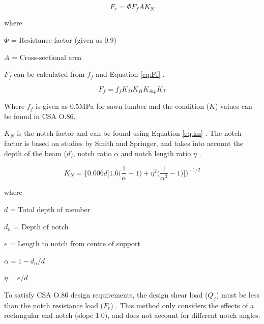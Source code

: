 \documentclass[11pt,a4paper]{article}
\numberwithin{equation}{subsection}
\begin{document}
	\begin{equation}
	F_{r} = \Phi F_{f} A K_{N} 
	\end{equation}     
     
     where\par
     $ \Phi $ = Resistance factor (given as 0.9) \par
     $ A $ = Cross-sectional area
     
     \vspace*{\baselineskip}
     
     \noindent
     $F_{f}$ can be calculated from $f_{f}$ and Equation \ref{eq:Ff} \cite{_csa_2014,_errata:_2013}.
     
   	\begin{equation}
   	F_{f} = f_{f} K_{D} K_{H} K_{Stp} K_{T}
   	\label{eq:Ff} 
   	\end{equation}  
     
     \noindent
     Where $f_{f}$ is given as 0.5MPa for sawn lumber and the condition ($K$) values can be found in CSA O.86.
 
     \vspace*{\baselineskip}
    
     \noindent    
     $K_{N}$ is the notch factor and can be found using Equation \ref{eq:kn} \cite{jockwer_structural_2014,_csa_2014}. The notch factor is based on studies by Smith and Springer, and takes into account the depth of the beam ($d$), notch ratio $\alpha$ and notch length ratio $\eta$ \cite{smith_consideration_1993}.
     
	\begin{equation}
	K_{N} = \bigg\{0.006d \bigg[1.6 \bigg(\dfrac{1}{\alpha}-1 \bigg)+\eta^{2} \bigg(\dfrac{1}{\alpha^{3}}-1\bigg) \bigg] \bigg\}^{-1/2} 
	\label{eq:kn}
	\end{equation} 
    
    where\par
    $ d $ = Total depth of member \par
    $ d_{n} $ = Depth of notch \par
    $ e $ = Length to notch from centre of support \par
    $\alpha = 1 - d_{n}/d$ \par
    $\eta = e/d$ \par
 
    \vspace*{\baselineskip}

    \noindent
    To satisfy CSA O.86 design requirements, the design shear load ($Q_{f}$) must be less than the notch resistance load ($F_{r}$) \cite{_csa_2014,_errata:_2013}. This method only considers the effects of a rectangular end notch (slope 1:0), and does not account for different notch angles.  
\end{document}
